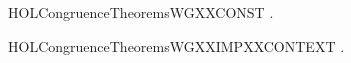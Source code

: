 \newcommand{\HOLCongruenceTheoremsWGXXcases}{\UseVerbatim{HOLCongruenceTheoremsWGXXcases}}
\begin{SaveVerbatim}{HOLCongruenceTheoremsWGXXCONST}
\HOLTokenTurnstile{} \HOLSymConst{\HOLTokenForall{}}.   \HOLSymConst{\HOLTokenImp{}}  
\end{SaveVerbatim}
\newcommand{\HOLCongruenceTheoremsWGXXCONST}{\UseVerbatim{HOLCongruenceTheoremsWGXXCONST}}
\begin{SaveVerbatim}{HOLCongruenceTheoremsWGXXIMPXXCONTEXT}
\HOLTokenTurnstile{} \HOLSymConst{\HOLTokenForall{}}.   \HOLSymConst{\HOLTokenImp{}}  
\end{SaveVerbatim}
\newcommand{\HOLCongruenceTheoremsWGXXIMPXXCONTEXT}{\UseVerbatim{HOLCongruenceTheoremsWGXXIMPXXCONTEXT}}
